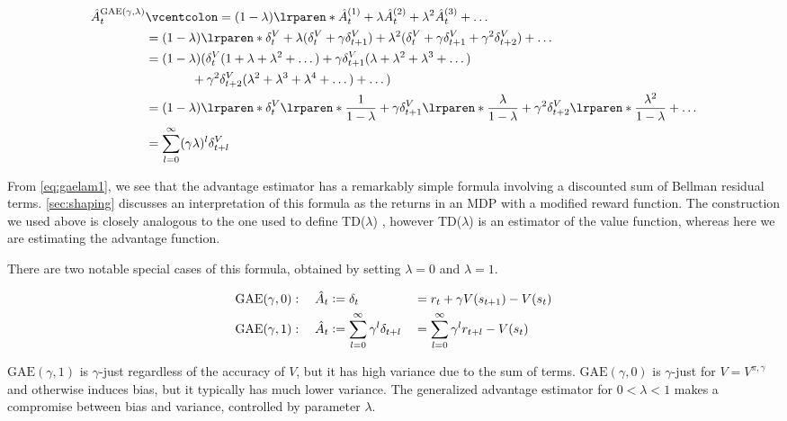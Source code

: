 \begin{align}
\hat{A}^{\mathrm{GAE(\gamma,\lambda)}}_t
&\vcentcolon= (1-\lambda)\lrparen*{ \hat{A}_t^{(1)} + \lambda \hat{A}_t^{(2)} + \lambda^2 \hat{A}_t^{(3)} + \dots  }\nonumber \\
&= (1-\lambda)\lrparen*{ \delta^V_t + \lambda (\delta^V_t + \gamma \delta^V_{t+1}) + \lambda^2 (\delta^V_t + \gamma \delta^V_{t+1} + \gamma^2 \delta^V_{t+2}) + \dots }\nonumber \\
&= (1-\lambda)(
\delta^V_t (1 + \lambda + \lambda^2 + \dots)
+\gamma \delta^V_{t+1} (\lambda + \lambda^2 + \lambda^3 + \dots)\nonumber \\
&\ \ \ \ \  \ \ \ \ \ \ +\gamma^2 \delta^V_{t+2} (\lambda^2 + \lambda^3 + \lambda^4 + \dots)
+\dots)
\nonumber \\
&= (1-\lambda)\lrparen*{
\delta^V_t \lrparen*{\frac{1}{1-\lambda}}
+\gamma \delta^V_{t+1} \lrparen*{\frac{\lambda}{1-\lambda}}
+\gamma^2 \delta^V_{t+2} \lrparen*{\frac{\lambda^2}{1-\lambda}}
+\dots}
\nonumber \\
&= \sum_{l=0}^{\infty} (\gamma \lambda)^{l} \delta^V_{t+l}
\label{eq:gaelam1}
\end{align}

From \ref{eq:gaelam1}, we see that the advantage estimator has a remarkably simple formula involving a discounted sum of Bellman residual terms.
\ref{sec:shaping} discusses an interpretation of this formula as the returns in an MDP with a modified reward function. The construction we used above is closely analogous to the one used to define TD($\lambda$) \citep{sutton1998introduction}, however TD($\lambda$) is an estimator of the value function, whereas here we are estimating the advantage function.

There are two notable special cases of this formula, obtained by setting $\lambda=0$ and $\lambda=1$.

\begin{alignat}{2}
\mathrm{GAE}(\gamma, 0):\ \ \ \hat{A}_t &\vcentcolon= \delta_t &&= r_t + \gamma V(s_{t+1}) - V(s_t)\label{eq:adv-ac}\\
\mathrm{GAE}(\gamma, 1):\ \ \ \hat{A}_t &\vcentcolon= \sum_{l=0}^{\infty} \gamma^{l} \delta_{t+l} &&= \sum_{l=0}^{\infty}\gamma^{l} r_{t+l} - V(s_t) \label{eq:adv-mc}
\end{alignat}

$\mathrm{GAE}(\gamma, 1)$ is $\gamma$-just regardless of the accuracy of $V$, but it has high variance due to the sum of terms.
$\mathrm{GAE}(\gamma, 0)$ is $\gamma$-just for $V = V^{\pi,\gamma}$ and otherwise induces bias, but it typically has much lower variance. The generalized advantage estimator for $0 < \lambda < 1$ makes a compromise between bias and variance, controlled by parameter $\lambda$.

